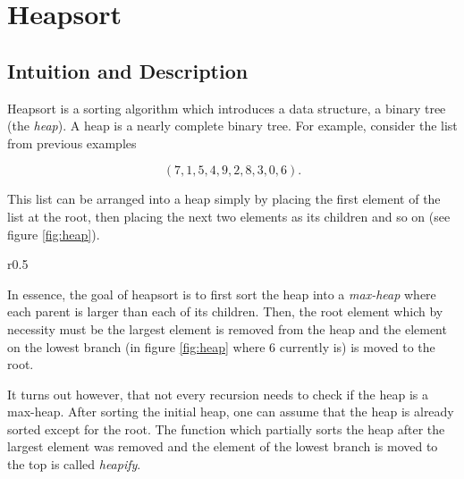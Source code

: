 \section{Heapsort}
\subsection{Intuition and Description}
Heapsort is a sorting algorithm which introduces a data structure, a binary tree (the \textit{heap}). A heap is a nearly complete binary tree. For example, consider the list from previous examples

\begin{equation*}
    (7, 1, 5, 4, 9, 2, 8, 3, 0, 6) \text{.}
\end{equation*}

This list can be arranged into a heap simply by placing the first element of the list at the root, then placing the next two elements as its children and so on (see figure \ref{fig:heap}).
\begin{wrapfigure}{r}{0.5\textwidth}
    \caption{the given list arranged into a heap}\label{fig:heap}
\end{wrapfigure}

In essence, the goal of heapsort is to first sort the heap into a \textit{max-heap} where each parent is larger than each of its children. Then, the root element which by necessity must be the largest element is removed from the heap and the element on the lowest branch (in figure \ref{fig:heap} where 6 currently is) is moved to the root.

It turns out however, that not every recursion needs to check if the heap is a max-heap. After sorting the initial heap, one can assume that the heap is already sorted except for the root. The function which partially sorts the heap after the largest element was removed and the element of the lowest branch is moved to the top is called \textit{heapify}.\cite[p.~135]{bib:introductiontoalgorithms} 

